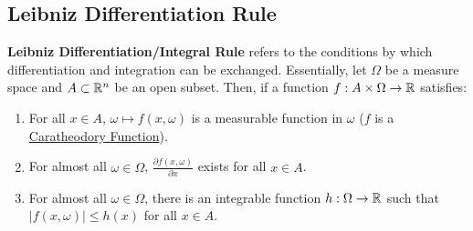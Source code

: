 \subsection{Leibniz Differentiation Rule}
\label{sec:leib_diff_rule}
\textbf{Leibniz Differentiation/Integral Rule} refers to the conditions by which differentiation and integration can be exchanged. Essentially, let $\Omega$ be a measure space and $A\subset\mathbb{R}^n$ be an open subset. Then, if a function $f:A \times \Omega \to \mathbb{R}$ satisfies:
\begin{enumerate}
	\item For all $x\in A$, $\omega\mapsto f(x, \omega)$ is a measurable function in $\omega$ ($f$ is a \underline{Caratheodory Function}).	
	\item For almost all $\omega\in\Omega$, $\frac{\partial f(x, \omega)}{\partial x}$ exists for all $x\in A$.
	\item For almost all $\omega\in\Omega$, there is an integrable function $h:\Omega\to\mathbb{R}$ such that $|f(x, \omega)|\le h(x)$ for all $x\in A$.
\end{enumerate} 

\begin{definition}
	
\end{definition} 
